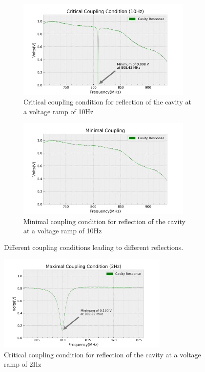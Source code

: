 \begin{figure}[h!]
\centering
\begin{subfigure}[t]{.475\textwidth}
  \centering
  \includegraphics[width=0.95\textwidth]{figures/PartB/scope_1.png}
  \caption{Critical coupling condition for reflection of the cavity at a voltage ramp of 10Hz}
 \label{fig:B_reflect_crit_10}
\end{subfigure}\hfill
\begin{subfigure}[t]{.475\textwidth}
  \centering
  \includegraphics[width=0.95\textwidth]{figures/PartB/scope_2.png}
  \caption{Minimal coupling condition for reflection of the cavity at a voltage ramp of 10Hz}
\label{fig:B_reflect_min}
\end{subfigure}
\caption{Different coupling conditions leading to different reflections.}
\label{fig:B_reflect_conditions}
\end{figure}

\begin{figure}[H]
\centering
\includegraphics[width=0.75\textwidth]{figures/PartB/scope_4.png}
\caption{Critical coupling condition for reflection of the cavity at a voltage ramp of 2Hz}
\label{fig:B_reflect_crit_2}
\end{figure}
\clearpage

